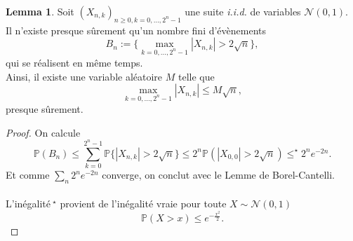 \documentclass{article}
\theoremstyle{definition}
\newtheorem{lem}[theo]{Lemma}
\numberwithin{equation}{section}
\begin{document}
\small{
\begin{lem}
\label{lemme}
Soit $(X_{n,k})_{n\geq 0, k=0,\dots,2^n-1}$ une suite \textit{i.i.d.} de variables $\mathcal{N}(0,1)$.\\
Il n'existe presque sûrement qu'un nombre fini d'évènements 
$$B_n:=\{\max_{k=0,\dots,2^n-1} |X_{n,k}|>2\sqrt{n}\},$$
qui se réalisent en même temps.\\
Ainsi, il existe  une variable aléatoire $M$ telle que 
$$ \max_{k=0,\dots,2^n-1} |X_{n,k}|\leq M \sqrt{n}, $$
presque sûrement.
\end{lem}

\begin{proof}
On calcule 
$$\mathbb{P}(B_n)\leq \sum_{k=0}^{2^n-1} \mathbb{P}\{|X_{n,k}|>2\sqrt{n}\} \leq 2^n \mathbb{P}(|X_{0,0}|>2\sqrt{n}) \leq^\star 2^n e^{-2n}.$$
Et comme $\sum_n 2^n e^{-2n}$ converge, on conclut avec le Lemme de Borel-Cantelli.\\
~\\
L'inégalité$~^\star$ provient de l'inégalité vraie pour toute $X\sim\mathcal{N}(0,1)$ 
$$\mathbb{P}(X>x)\leq e^{-\frac{x^2}{2}}.$$
\end{proof}

}
\end{document}
